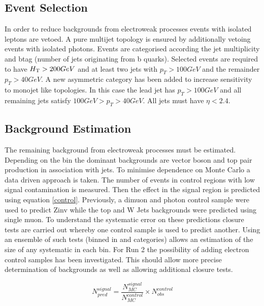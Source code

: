 \subsection{Event Selection}
In order to reduce backgrounds from electroweak processes events with isolated leptons are vetoed. A pure multijet topology is ensured by additionally vetoing events with isolated photons. Events are categorised according the jet multiplicity and btag (number of jets originating from b quarks). Selected events are required to have $\mbox{$H_\text{T}$} > 200 GeV$ and at least two jets with $p_T > 100GeV$ and the remainder $p_T > 40GeV$. A new asymmetric category has been added to increase sensitivity to monojet like topologies. In this case the lead jet has $p_T > 100 GeV$ and all remaining jets satisfy $100 GeV > p_T > 40GeV$. All jets must have $\eta < 2.4$.

\subsection{Background Estimation}
The remaining background from electroweak processes must be estimated. Depending on the bin the dominant backgrounds are vector boson and top pair production in association with jets. To minimise dependence on Monte Carlo a data driven approach is taken. The number of events in control regions with low signal contamination is measured. Then the effect in the signal region is predicted using equation \ref{control}. Previously, a dimuon and photon control sample were used to predict Zinv while the top and W Jets backgrounds were predicted using single muon. To understand the systematic error on these predictions closure tests are carried out whereby one control sample is used to predict another. Using an ensemble of such tests (binned in \scalht and categories) allows an estimation of the size of any systematic in each bin. For Run 2 the possibility of adding electron control samples has been investigated. This should allow more precise determination of backgrounds as well as allowing additional closure tests.

\begin{equation}
\label{control}
N_{pred}^{signal}=\frac{N_{MC}^{signal}}{N_{MC}^{control}}\times N^{control}_{obs}
\end{equation} 

